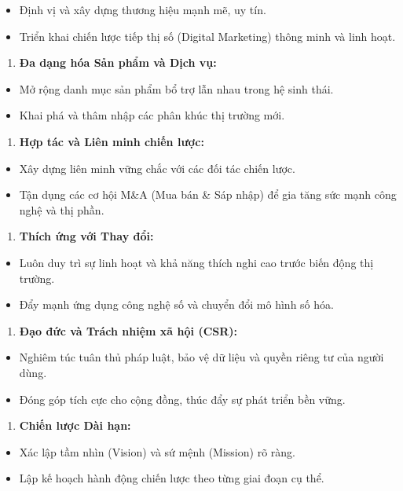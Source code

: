 \documentclass[11pt,a4paper,oneside]{report}
\begin{document}
\begin{itemize}[leftmargin=1.5em]
\item Định vị và xây dựng thương hiệu mạnh mẽ, uy tín.
\item Triển khai chiến lược tiếp thị số (Digital Marketing) thông minh và linh hoạt.
\end{itemize}
\begin{enumerate}[leftmargin=1.5em]
\item \textbf{Đa dạng hóa Sản phẩm và Dịch vụ:}
\end{enumerate}
\begin{itemize}[leftmargin=1.5em]
\item Mở rộng danh mục sản phẩm bổ trợ lẫn nhau trong hệ sinh thái.
\item Khai phá và thâm nhập các phân khúc thị trường mới.
\end{itemize}
\begin{enumerate}[leftmargin=1.5em]
\item \textbf{Hợp tác và Liên minh chiến lược:}
\end{enumerate}
\begin{itemize}[leftmargin=1.5em]
\item Xây dựng liên minh vững chắc với các đối tác chiến lược.
\item Tận dụng các cơ hội M\&A (Mua bán \& Sáp nhập) để gia tăng sức mạnh công nghệ và thị phần.
\end{itemize}
\begin{enumerate}[leftmargin=1.5em]
\item \textbf{Thích ứng với Thay đổi:}
\end{enumerate}
\begin{itemize}[leftmargin=1.5em]
\item Luôn duy trì sự linh hoạt và khả năng thích nghi cao trước biến động thị trường.
\item Đẩy mạnh ứng dụng công nghệ số và chuyển đổi mô hình số hóa.
\end{itemize}
\begin{enumerate}[leftmargin=1.5em]
\item \textbf{Đạo đức và Trách nhiệm xã hội (CSR):}
\end{enumerate}
\begin{itemize}[leftmargin=1.5em]
\item Nghiêm túc tuân thủ pháp luật, bảo vệ dữ liệu và quyền riêng tư của người dùng.
\item Đóng góp tích cực cho cộng đồng, thúc đẩy sự phát triển bền vững.
\end{itemize}
\begin{enumerate}[leftmargin=1.5em]
\item \textbf{Chiến lược Dài hạn:}
\end{enumerate}
\begin{itemize}[leftmargin=1.5em]
\item Xác lập tầm nhìn (Vision) và sứ mệnh (Mission) rõ ràng.
\item Lập kế hoạch hành động chiến lược theo từng giai đoạn cụ thể.
\end{itemize}
\end{document}
